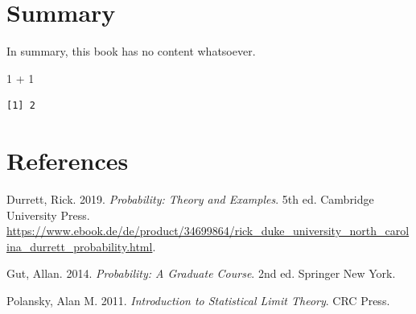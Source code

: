 \documentclass[
  letterpaper,
  DIV=11,
  numbers=noendperiod]{scrreprt}
\newenvironment{Shaded}{\begin{snugshade}}{\end{snugshade}}
\newcommand{\DecValTok}[1]{\textcolor[rgb]{0.68,0.00,0.00}{#1}}
\newcommand{\SpecialCharTok}[1]{\textcolor[rgb]{0.37,0.37,0.37}{#1}}
\newlength{\cslhangindent}
\newenvironment{CSLReferences}[2] %
 {\begin{list}{}{%
  \setlength{\itemindent}{0pt}
  \setlength{\leftmargin}{0pt}
  \setlength{\parsep}{0pt}
  \ifodd #1
   \setlength{\leftmargin}{\cslhangindent}
   \setlength{\itemindent}{-1\cslhangindent}
  \fi
  \setlength{\itemsep}{#2\baselineskip}}}
 {\end{list}}
\theoremstyle{plain}
\theoremstyle{definition}
\theoremstyle{definition}
\theoremstyle{plain}
\theoremstyle{plain}
\theoremstyle{remark}
\begin{document}
\chapter{Summary}\label{summary}

In summary, this book has no content whatsoever.

\begin{Shaded}
\begin{Highlighting}[]
\DecValTok{1} \SpecialCharTok{+} \DecValTok{1}
\end{Highlighting}
\end{Shaded}

\begin{verbatim}
[1] 2
\end{verbatim}

\chapter*{References}\label{references-1}


\label{refs}
\begin{CSLReferences}{1}{0}
Durrett, Rick. 2019. \emph{Probability: Theory and Examples}. 5th ed.
Cambridge University Press.
\url{https://www.ebook.de/de/product/34699864/rick_duke_university_north_carolina_durrett_probability.html}.

Gut, Allan. 2014. \emph{Probability: A Graduate Course}. 2nd ed.
Springer New York.

Polansky, Alan M. 2011. \emph{Introduction to Statistical Limit Theory}.
CRC Press.

\end{CSLReferences}
\end{document}
